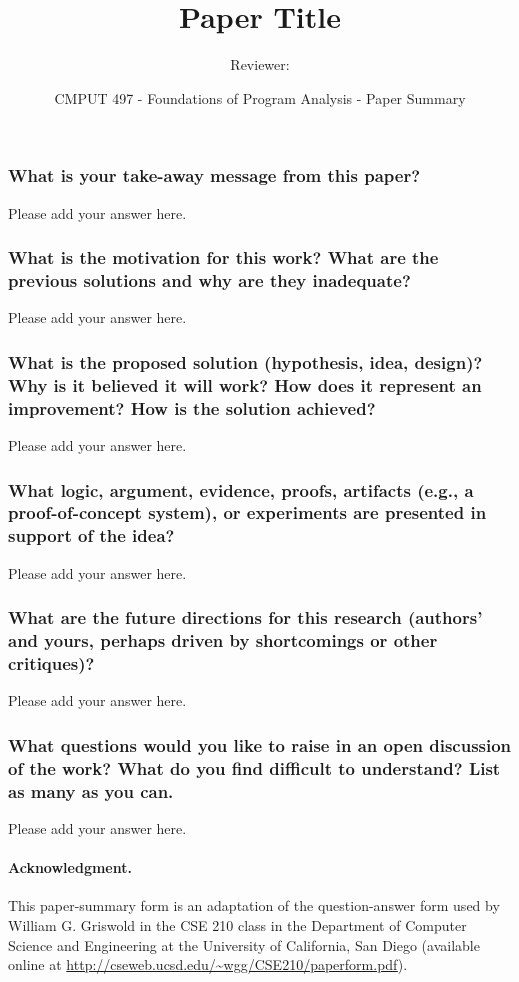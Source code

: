 \documentclass{article}
\title{Paper Title}
\author{Reviewer: }
\date{CMPUT 497 - Foundations of Program Analysis - Paper Summary}
\begin{document}
\maketitle

\subsubsection*{What is your take-away message from this paper?}
Please add your answer here.



\subsubsection*{What is the motivation for this work? What are the previous solutions and why are they inadequate?}
Please add your answer here.



\subsubsection*{What is the proposed solution (hypothesis, idea, design)? Why is it believed it will work? How does it represent an improvement? How is the solution achieved?}
Please add your answer here.



\subsubsection*{What logic, argument, evidence, proofs, artifacts (e.g., a proof-of-concept system), or experiments are presented in support of the idea?}
Please add your answer here.



\subsubsection*{What are the future directions for this research (authors' and yours, perhaps driven by shortcomings or other critiques)?}
Please add your answer here.



\subsubsection*{What questions would you like to raise in an open discussion of the work? What do you find difficult to understand? List as many as you can.}
Please add your answer here.


\paragraph{Acknowledgment.} This paper-summary form is an adaptation of the question-answer form used by William G. Griswold in the CSE 210 class in the Department of Computer Science and Engineering at the University of California, San Diego (available online at \url{http://cseweb.ucsd.edu/~wgg/CSE210/paperform.pdf}).
\end{document}
